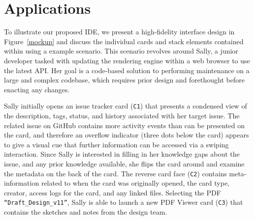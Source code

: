 \documentclass{ppig}
\begin{document}
\section{Applications}

To illustrate our proposed IDE, we present a high-fidelity interface design in Figure~\ref{mockup} and discuss the individual cards and stack elements contained within using a example scenario.
This scenario revolves around Sally, a junior developer tasked with updating the rendering engine within a web browser to use the latest API.
Her goal is a code-based solution to performing maintenance on a large and complex codebase, which requires prior design and forethought before enacting any changes.

Sally initially opens an issue tracker card (\texttt{C1}) that presents a condensed view of the description, tags, status, and history associated with her target issue.
The related issue on GitHub contains more activity events than can be presented on the card, and therefore an overflow indicator (three dots below the card) appears to give a visual cue that further information can be accessed via a swiping interaction.
Since Sally is interested in filling in her knowledge gaps about the issue, and any prior knowledge available, she flips the card around and examine the metadata on the back of the card.
The reverse card face (\texttt{C2}) contains meta-information related to when the card was originally opened, the card type, creator, access logs for the card, and any linked files.
Selecting the PDF \texttt{``Draft\_Design\_v11''}, Sally is able to launch a new PDF Viewer card (\texttt{C3}) that contains the sketches and notes from the design team.
\end{document}
